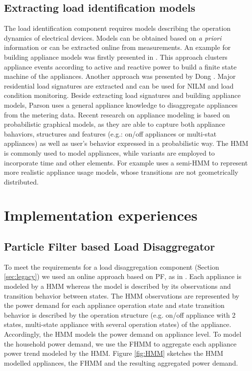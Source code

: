 \documentclass{article}
\begin{document}
\subsection{Extracting load identification models}
The load identification component requires models describing the operation dynamics of electrical devices.
Models can be obtained based on {\em a priori} information or can be extracted online from measurements.
An example for building appliance models was firstly presented in \cite{Hart1992}.
This approach clusters appliance events according to active and reactive power to build a finite state machine of the appliances.
Another approach was presented by Dong \cite{Dong2013}. Major residential load signatures are extracted and can be used for \ac{NILM} and load condition monitoring.
Beside extracting load signatures and building appliance models, Parson \cite{parson2012} uses a general appliance knowledge to disaggregate appliances from the metering data.
Recent research on appliance modeling is based on probabilistic graphical models, as they are able to capture both appliance bahaviors, structures and features (e.g.: on/off appliances or multi-stat appliances) as well as user's behavior expressed in a probabilistic way.
The \ac{HMM} is commonly used to model appliances, while variants are employed to incorporate time and other elements.
For example \cite{Wong2014} uses a semi-\ac{HMM} to represent more realistic appliance usage models, whose transitions are not geometrically distributed.

\section{Implementation experiences}\label{sec:casestudy}

\subsection{Particle Filter based Load Disaggregator}
To meet the requirements for a load disaggregation component (Section \ref{sec:legacy}) we used an online approach based on \ac{PF}, as in \cite{Egarter2013:BuildSys}.
Each appliance is modeled by a \ac{HMM} whereas the model is described by its observations and transition behavior between states.
The \ac{HMM} observations are represented by the power demand for each appliance operation state and state transition behavior is described by the operation structure (e.g. on/off appliance with 2 states, multi-state appliance with several operation states) of the appliance.
Accordingly, the \ac{HMM} models the power demand on appliance level.
To model the household power demand, we use the \ac{FHMM} to aggregate each appliance power trend modeled by the \ac{HMM}.
Figure \ref{fig:HMM} sketches the \ac{HMM} modelled appliances, the \ac{FHMM} and the resulting aggregated power demand.
\end{document}

